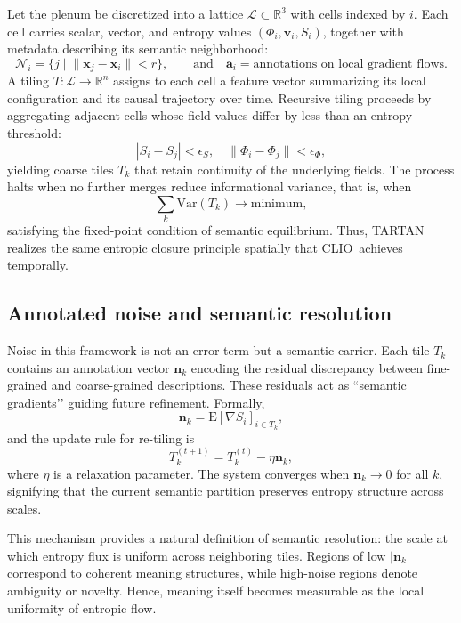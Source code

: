 \documentclass[12pt,a4paper]{article}
\newcommand{\CLIO}{CLIO}              %
\theoremstyle{plain}
\begin{document}
Let the plenum be discretized into a lattice \(\mathcal{L}\subset \mathbb{R}^3\) with cells indexed by \(i\).  
Each cell carries scalar, vector, and entropy values \((\Phi_i,\mathbf{v}_i,S_i)\), together with metadata describing its semantic neighborhood:
\[
\mathcal{N}_i = \{ j \;|\; \|\mathbf{x}_j-\mathbf{x}_i\| < r \},
\qquad
\text{and}
\quad
\mathbf{a}_i = \text{annotations on local gradient flows.}
\]
A tiling \(T: \mathcal{L}\to\mathbb{R}^n\) assigns to each cell a feature vector summarizing its local configuration and its causal trajectory over time.
Recursive tiling proceeds by aggregating adjacent cells whose field values differ by less than an entropy threshold:
\[
|S_i-S_j|<\epsilon_S, 
\quad 
\|\Phi_i-\Phi_j\|<\epsilon_\Phi,
\]
yielding coarse tiles \(T_k\) that retain continuity of the underlying fields.
The process halts when no further merges reduce informational variance, that is, when
\[
\sum_{k}\mathrm{Var}(T_k)\to\mathrm{minimum},
\]
satisfying the fixed-point condition of semantic equilibrium.
Thus, TARTAN realizes the same entropic closure principle spatially that \CLIO\ achieves temporally.

\subsection{Annotated noise and semantic resolution}
Noise in this framework is not an error term but a semantic carrier.
Each tile \(T_k\) contains an annotation vector \(\mathbf{n}_k\)
encoding the residual discrepancy between fine-grained and coarse-grained descriptions.
These residuals act as “semantic gradients’’ guiding future refinement.
Formally,
\[
\mathbf{n}_k = \mathrm{E}[\nabla S_i]_{i\in T_k},
\]
and the update rule for re-tiling is
\[
T_k^{(t+1)} = 
T_k^{(t)} - \eta \mathbf{n}_k,
\]
where \(\eta\) is a relaxation parameter.
The system converges when \(\mathbf{n}_k\to 0\) for all \(k\),
signifying that the current semantic partition preserves entropy structure across scales.

This mechanism provides a natural definition of semantic resolution:
the scale at which entropy flux is uniform across neighboring tiles.
Regions of low \(|\mathbf{n}_k|\) correspond to coherent meaning structures,
while high-noise regions denote ambiguity or novelty.
Hence, meaning itself becomes measurable as the local uniformity of entropic flow.
\end{document}
